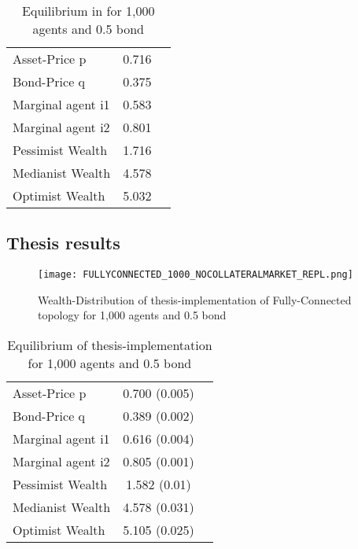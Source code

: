 \documentclass[Bachelorarbeit.tex]{subfiles}
\begin{document}
\begin{table}[H]
	\centering
	\caption{Equilibrium in \cite{Breuer2015} for 1,000 agents and 0.5 bond}
	\begin{tabular} { l c r }
		\hline
		Asset-Price p & 0.716 \\
		Bond-Price q & 0.375 \\
		Marginal agent i1 & 0.583 \\
		Marginal agent i2 & 0.801 \\
		\hline
		Pessimist Wealth & 1.716 \\
		Medianist Wealth & 4.578 \\
		Optimist Wealth & 5.032 \\
		\hline
	\end{tabular}
	\label{tab:equilibrium_BREUER_1000}
\end{table}

\subsection{Thesis results}

\begin{figure}[H]
	\centering
  \texttt{[image: FULLYCONNECTED\_1000\_NOCOLLATERALMARKET\_REPL.png]}
	\caption{Wealth-Distribution of thesis-implementation of Fully-Connected topology for 1,000 agents and 0.5 bond}
	\label{fig:wealth_FULLYCONNECTED_1000_NOCOLLATERALMARKET_REPL}
\end{figure}

\begin{table}[H]
	\centering
	\caption{Equilibrium of thesis-implementation for 1,000 agents and 0.5 bond}
	\begin{tabular} { l c r }
		\hline
		Asset-Price p & 0.700 (0.005) \\
		Bond-Price q & 0.389 (0.002) \\
		Marginal agent i1 & 0.616 (0.004) \\
		Marginal agent i2 & 0.805 (0.001) \\
		\hline
		Pessimist Wealth & 1.582 (0.01) \\
		Medianist Wealth & 4.578 (0.031) \\
		Optimist Wealth & 5.105 (0.025) \\
		\hline
	\end{tabular}
	\label{tab:equilibrium_THESIS_1000_50_REPL}
\end{table}
\end{document}
